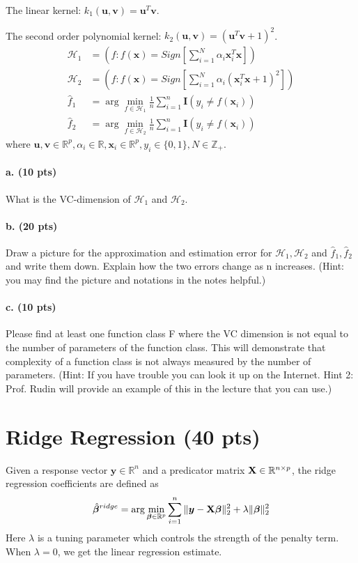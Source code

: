 \documentclass[11pt]{article}
\newcommand{\Xmat}[0]{{{\bf X}}}
\newcommand{\uv}{\boldsymbol{u}}
\newcommand{\vv}{\boldsymbol{v}}
\newcommand{\xv}{\boldsymbol{x}}
\newcommand{\yv}{\boldsymbol{y}}
\newcommand{\betav}[0]{{\boldsymbol{\beta}}}
\newcommand{\Hcal}{\mathcal{H}}
\begin{document}
\noindent The linear kernel: $k_1(\uv,\vv)=\uv^T\vv$. 

\noindent The second order polynomial kernel: $k_2(\uv,\vv)=(\uv^T\vv+1)^2$.
\begin{align*}
\Hcal_1 &= (f:f(\xv)=Sign[\sum_{i=1}^{N}\alpha_i\xv_i^T\xv])\\
\Hcal_2 &= (f:f(\xv)=Sign[\sum_{i=1}^{N}\alpha_i(\xv_i^T\xv+1)^2])\\
\hat{f}_1 &= \arg\min_{f\in\Hcal_1}\frac{1}{n}\sum_{i=1}^{n}\mathbf{I}(y_i\neq f(\xv_i))\\
\hat{f}_2 &= \arg\min_{f\in\Hcal_2}\frac{1}{n}\sum_{i=1}^{n}\mathbf{I}(y_i\neq f(\xv_i))
\end{align*}
\noindent where $\uv, \vv\in\mathbb{R}^p, \alpha_i\in\mathbb{R}, \xv_i\in\mathbb{R}^p, y_i\in\{0,1\}, N\in\mathbb{Z}_+$.

\paragraph{a. (10 pts)} What is the VC-dimension of $\Hcal_1$ and $\Hcal_2$.
\paragraph{b. (20 pts)} Draw a picture for the approximation and estimation error for $\Hcal_1,\Hcal_2$ and $\hat{f}_1,\hat{f}_2$ and write them down. Explain how the two errors change as n increases. (Hint: you may find the picture and notations in the notes helpful.)
\paragraph{c. (10 pts)} Please find at least one function class F where the VC dimension is not equal to the number of parameters of the function class. This will demonstrate that complexity of a function class is not always measured by the number of parameters. (Hint: If you have trouble you can look it up on the Internet. Hint 2: Prof. Rudin will provide an example of this in the lecture that you can use.)

\section{Ridge Regression (40 pts)}
Given a response vector $\yv\in\mathbb{R}^n$ and a predicator matrix $\Xmat\in\mathbb{R}^{n\times p}$, the ridge regression coefficients are defined as
\begin{align*}
\hat{\betav}^{ridge} = \arg\min_{\betav\in\mathbb{R}^p}\sum_{i=1}^{n}\|\yv-\Xmat\betav\|_2^2+\lambda\|\betav\|_2^2
\end{align*}
Here $\lambda$ is a tuning parameter which controls the strength of the penalty term. When $\lambda=0$, we get the linear regression estimate.
\end{document}
